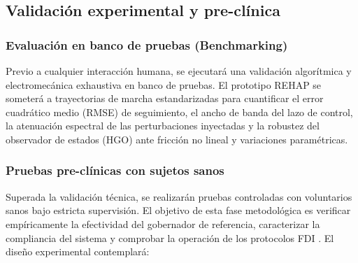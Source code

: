 \documentclass[a4paper,12pt]{article}
\begin{document}
\subsection{Validación experimental y pre-clínica}

\subsubsection{Evaluación en banco de pruebas (Benchmarking)}
Previo a cualquier interacción humana, se ejecutará una validación algorítmica y electromecánica exhaustiva en banco de pruebas. El prototipo REHAP se someterá a trayectorias de marcha estandarizadas para cuantificar el error cuadrático medio (RMSE) de seguimiento, el ancho de banda del lazo de control, la atenuación espectral de las perturbaciones inyectadas y la robustez del observador de estados (HGO) ante fricción no lineal y variaciones paramétricas.

\subsubsection{Pruebas pre-clínicas con sujetos sanos}
Superada la validación técnica, se realizarán pruebas controladas con voluntarios sanos bajo estricta supervisión. El objetivo de esta fase metodológica es verificar empíricamente la efectividad del gobernador de referencia, caracterizar la compliancia del sistema y comprobar la operación de los protocolos FDI \citep{cruz_methodology_2017}. El diseño experimental contemplará:
\end{document}
